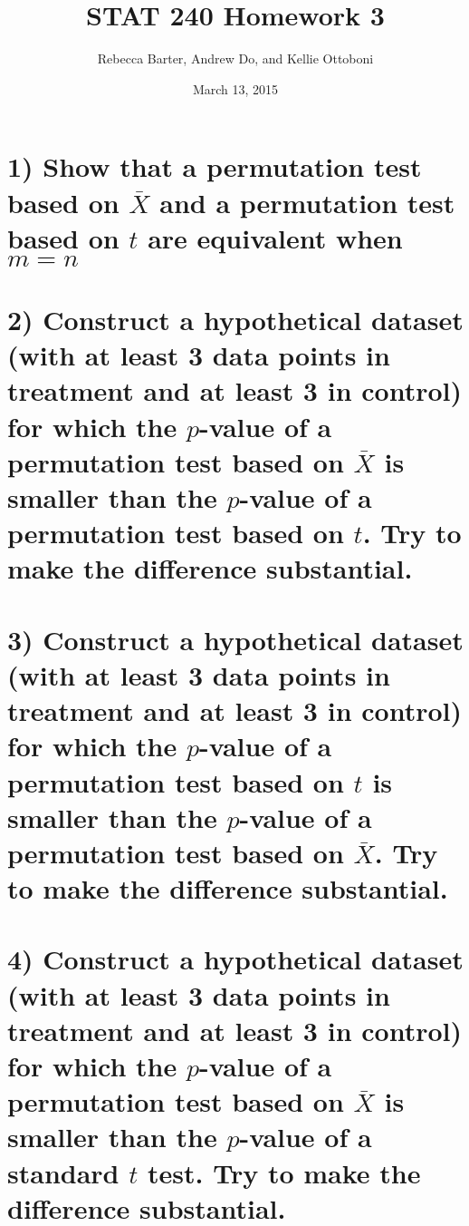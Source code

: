 \documentclass[11pt]{article}
\title{STAT 240 Homework 3}
\author{Rebecca Barter, Andrew Do, and Kellie Ottoboni}
\date{March 13, 2015} %
\begin{document}
\maketitle


\section*{1) Show that a permutation test based on $\bar{X}$ and a permutation test based on $t$ are equivalent when $m = n$}

\section*{2) Construct a hypothetical dataset (with at least 3 data points in treatment and at least 3 in control) for which the $p$-value of a permutation test based on $\bar{X}$ is smaller than the $p$-value of a permutation test based on $t$. Try to make the difference substantial.}


\section*{3) Construct a hypothetical dataset (with at least 3 data points in treatment and at least 3 in control) for which the $p$-value of a permutation test based on $t$ is smaller than the $p$-value of a permutation test based on $\bar{X}$. Try to make the difference substantial.}

\section*{4) Construct a hypothetical dataset (with at least 3 data points in treatment and at least 3 in control) for which the $p$-value of a permutation test based on $\bar{X}$ is smaller than the $p$-value of a standard $t$ test. Try to make the difference substantial.}
\end{document}
